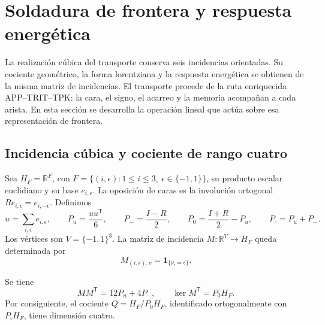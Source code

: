 
\section{Soldadura de frontera y respuesta energética}
\label{vii:sec:pantalla-respuesta}

La realización cúbica del transporte conserva seis incidencias orientadas.
Su cociente geométrico, la forma lorentziana y la respuesta energética
se obtienen de la misma matriz de incidencias. El transporte procede de
la ruta enriquecida APP--TRIT--TPK: la cara, el signo, el acarreo y la
memoria acompañan a cada arista. En esta sección se desarrolla la
operación lineal que actúa sobre esa representación de frontera.

\subsection{Incidencia cúbica y cociente de rango cuatro}
\label{vii:sec:cociente-pantalla}

Sea \(H_F=\mathbb R^F\), con
\(F=\{(i,\epsilon):1\leq i\leq3,\ \epsilon\in\{-1,1\}\}\),
su producto escalar euclidiano y su base \(e_{i,\epsilon}\).
La oposición de caras es la involución ortogonal
\(Re_{i,\epsilon}=e_{i,-\epsilon}\). Definimos
\[
 u=\sum_{i,\epsilon}e_{i,\epsilon},\qquad
 P_u=\frac{uu^{\mathsf T}}6,\qquad P_-=\frac{I-R}{2},\qquad
 P_0=\frac{I+R}{2}-P_u,\qquad P_\square=P_u+P_-.
\]
Los vértices son \(V=\{-1,1\}^3\). La matriz de incidencia
\(M:\mathbb R^V\longrightarrow H_F\) queda determinada por
\[
 M_{(i,\epsilon),\nu}=\mathbf1_{\{\nu_i=\epsilon\}}.
\]

\begin{proposition}
\label{vii:prop:incidencia}
Se tiene
\[
 MM^{\mathsf T}=12P_u+4P_-,
 \qquad
 \ker M^{\mathsf T}=P_0H_F.
\]
Por consiguiente, el cociente
\(Q=H_F/P_0H_F\), identificado ortogonalmente con
\(P_\square H_F\), tiene dimensión cuatro.
\end{proposition}


